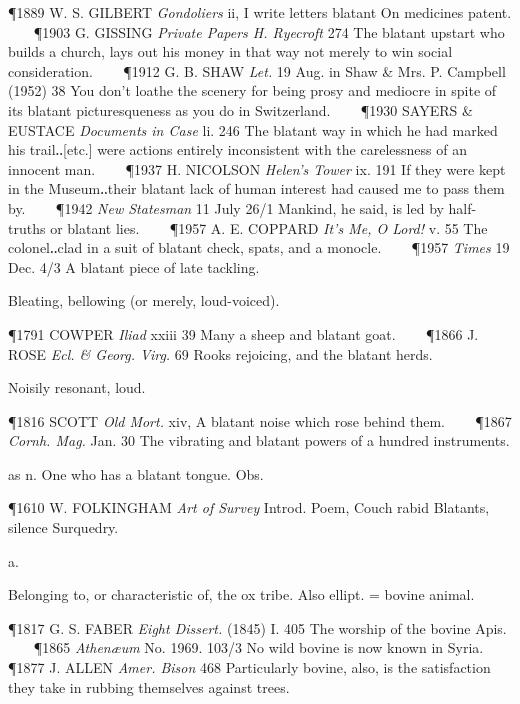 \begin{description}[wide, labelwidth=!, labelindent=0pt]
\begin{myenumerate}
\P 1889 W. S. GILBERT  \textit{Gondoliers} ii, I write letters blatant On medicines patent.    
\P 1903 G. GISSING  \textit{Private Papers H. Ryecroft} 274 The blatant upstart who builds a church, lays out his money in that way not merely to win social consideration.    
\P 1912 G. B. SHAW  \textit{Let.} 19 Aug. in Shaw \& Mrs. P. Campbell (1952) 38 You don't loathe the scenery for being prosy and mediocre in spite of its blatant picturesqueness as you do in Switzerland.    
\P 1930 SAYERS  \& EUSTACE \textit{Documents in Case} li. 246 The blatant way in which he had marked his trail‥[etc.] were actions entirely inconsistent with the carelessness of an innocent man.    
\P 1937 H. NICOLSON  \textit{Helen's Tower} ix. 191 If they were kept in the Museum‥their blatant lack of human interest had caused me to pass them by.    
\P 1942 \textit{New Statesman} 11 July 26/1 Mankind, he said, is led by half-truths or blatant lies.    
\P 1957 A. E. COPPARD  \textit{It's Me, O Lord!} v. 55 The colonel‥clad in a suit of blatant check, spats, and a monocle.    
\P 1957  \textit{Times} 19 Dec. 4/3 A blatant piece of late tackling.

 Bleating, bellowing (or merely, loud-voiced).

\P 1791 COWPER  \textit{Iliad} xxiii 39 Many a sheep and blatant goat.    
\P 1866 J. ROSE  \textit{Ecl. \& Georg. Virg.} 69 Rooks rejoicing, and the blatant herds.

 Noisily resonant, loud.

\P 1816 SCOTT  \textit{Old Mort.} xiv, A blatant noise which rose behind them.    
\P 1867 \textit{Cornh.  Mag.} Jan. 30 The vibrating and blatant powers of a hundred instruments.

 as n. One who has a blatant tongue. Obs.

\P 1610 W. FOLKINGHAM  \textit{Art of Survey} Introd. Poem, Couch rabid Blatants, silence Surquedry.
\end{myenumerate}


 a.

\noindent {}


\noindent
Belonging to, or characteristic of, the ox tribe. Also ellipt. = bovine animal.

\P 1817 G. S. FABER  \textit{Eight Dissert.} (1845) I. 405 The worship of the bovine Apis.    
\P 1865 \textit{Athenæum}  No. 1969. 103/3 No wild bovine is now known in Syria.    
\P 1877 J. ALLEN  \textit{Amer. Bison} 468 Particularly bovine, also, is the satisfaction they take in rubbing themselves against trees.


\end{description}
